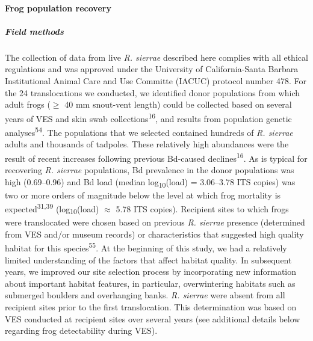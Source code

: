 \documentclass[
  letterpaper,
  DIV=11,
  numbers=noendperiod]{scrartcl}
\let\oldparagraph\paragraph
\renewcommand{\paragraph}[1]{\oldparagraph{#1}\mbox{}}
\let\oldsubparagraph\subparagraph
\renewcommand{\subparagraph}[1]{\oldsubparagraph{#1}\mbox{}}
\begin{document}
\paragraph{Frog population recovery}\label{frog-population-recovery-1}

\subparagraph{Field methods}\label{field-methods}

The collection of data from live \emph{R. sierrae} described here
complies with all ethical regulations and was approved under the
University of California-Santa Barbara Institutional Animal Care and Use
Committe (IACUC) protocol number 478. For the 24 translocations we
conducted, we identified donor populations from which adult frogs
(\(\geq\) 40 mm snout-vent length) could be collected based on several
years of VES and skin swab collections\textsuperscript{16}, and results
from population genetic analyses\textsuperscript{54}. The populations
that we selected contained hundreds of \emph{R. sierrae} adults and
thousands of tadpoles. These relatively high abundances were the result
of recent increases following previous Bd-caused
declines\textsuperscript{16}. As is typical for recovering \emph{R.
sierrae} populations, Bd prevalence in the donor populations was high
(0.69--0.96) and Bd load (median log\textsubscript{10}(load) =
3.06--3.78 ITS copies) was two or more orders of magnitude below the
level at which frog mortality is expected\textsuperscript{31,39}
(log\textsubscript{10}(load) \(\approx\) 5.78 ITS copies). Recipient
sites to which frogs were translocated were chosen based on previous
\emph{R. sierrae} presence (determined from VES and/or museum records)
or characteristics that suggested high quality habitat for this
species\textsuperscript{55}. At the beginning of this study, we had a
relatively limited understanding of the factors that affect habitat
quality. In subsequent years, we improved our site selection process by
incorporating new information about important habitat features, in
particular, overwintering habitats such as submerged boulders and
overhanging banks. \emph{R. sierrae} were absent from all recipient
sites prior to the first translocation. This determination was based on
VES conducted at recipient sites over several years (see additional
details below regarding frog detectability during VES).
\end{document}
